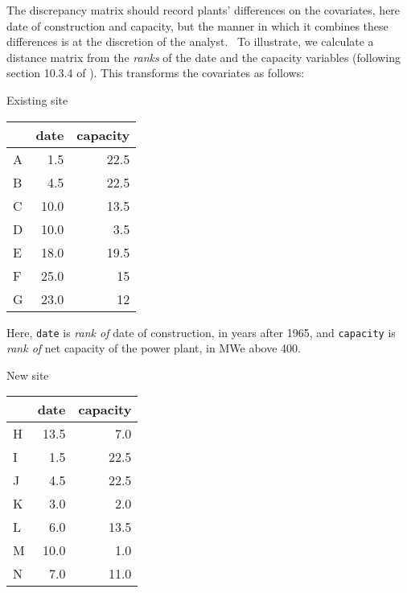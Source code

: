 \documentclass[12pt,twoside]{article}
\begin{document}
{{\bigskip

{\ttfamily
\textrm{The discrepancy matrix should record plants' differences on the
covariates, here date of construction and capacity, but the manner in
which it combines these differences is at the discretion of the
analyst. \ To illustrate, we calculate a distance matrix from
the}\textrm{\textit{ ranks}}\textrm{ of the date and the capacity
variables (following section 10.3.4 of
\citep{rosenbaum:2002}). This transforms the
covariates as follows:}}


\bigskip
\begin{minipage}[t]{.4\textwidth}
\begin{center} 
Existing site\\
{%
\begin{tabular}{lrr}
\hline
 & date & capacity \\
\hline
A & 1.5 & {22.5}   \\
B & 4.5 & {22.5}   \\
C & 10.0 & {13.5}  \\
D & 10.0 &  {3.5}  \\
E & 18.0 & {19.5}  \\
F & 25.0 &   {15}  \\
G & 23.0 &   {12}  \\
\hline
\end{tabular}}
\end{center}
\bigskip
\bigskip
{\footnotesize Here, \texttt{date} is \emph{rank of} date of
construction, in years after 1965, and  \texttt{capacity} is 
\emph{rank of} net capacity of the power plant, in MWe 
above 400.}
\end{minipage}
\begin{minipage}[t]{.4\textwidth}
\begin{center} 
New site\\
{\footnotesize
\begin{tabular}{lrr}
\hline
 & date & capacity \\
\hline
 {H} & 13.5 & 7.0 \\
 {I} & 1.5 & 22.5 \\
 {J} & 4.5 & 22.5 \\
 {K} & 3.0 & 2.0 \\
 {L} & 6.0 & 13.5 \\
 {M} & 10.0 & 1.0 \\
 {N} & 7.0 & 11.0 \\

\end{tabular}}
\end{center}
\end{minipage}}}
\end{document}
